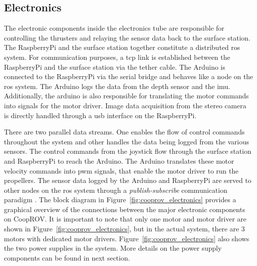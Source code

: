 \subsection{Electronics}

The electronic components inside the electronics tube are responsible for controlling the thrusters and relaying the sensor data back to the surface station. The RaspberryPi and the surface station together constitute a distributed \gls{ros} system. For communication purposes, a \gls{tcp} link is established between the RaspberryPi and the surface station via the tether cable. The Arduino is connected to the RaspberryPi via the serial bridge and behaves like a node on the \gls{ros} system. The Arduino logs the data from the depth sensor and the \gls{imu}. Additionally, the arduino is also responsible for translating the motor commands into signals for the motor driver. Image data acquisition from the stereo camera is directly handled through a usb interface on the RaspberryPi.

There are two parallel data streams. One enables the flow of control commands throughout the system and other handles the data being logged from the various sensors. The control commands from the joystick flow through the surface station and RaspberryPi to reach the Arduino. The Arduino translates these motor velocity commands into \gls{pwm} signals, that enable the motor driver to run the propellers. The sensor data logged by the Arduino and RaspberryPi are served to other nodes on the \gls{ros} system through a \emph{publish-subscribe} communication paradigm \cite{eugster}. The block diagram in Figure~\ref{fig:cooprov_electronics} provides a graphical overview of the connections between the major electronic components on CoopROV. It is important to note that only one motor and motor driver are shown in Figure~\ref{fig:cooprov_electronics}, but in the actual system, there are 3 motors with dedicated motor drivers. Figure~\ref{fig:cooprov_electronics} also shows the two power supplies in the system. More details 
on the power supply components can be found in next section.

